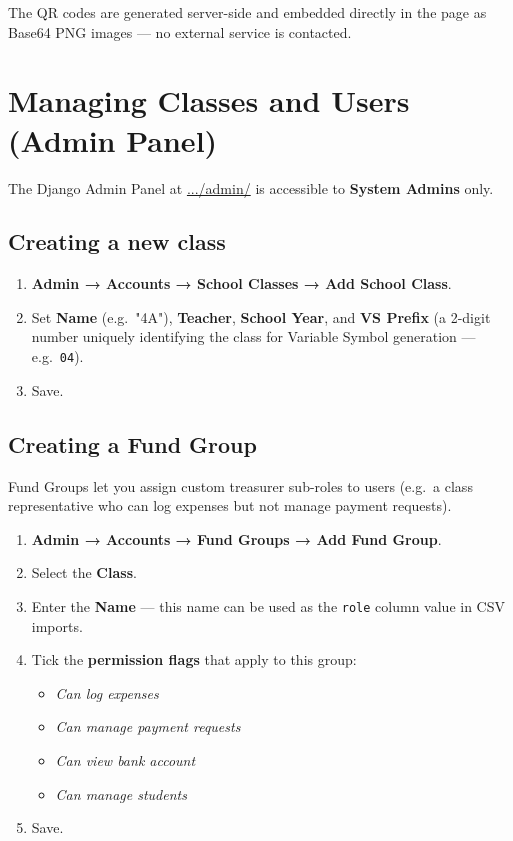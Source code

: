 \documentclass[a4paper,11pt]{article}
\begin{document}
\noindent
The QR codes are generated server-side and embedded directly in the page
as Base64 PNG images — no external service is contacted.

\section{Managing Classes and Users (Admin Panel)}
\label{sec:admin}

The Django Admin Panel at \url{.../admin/} is accessible to \textbf{System Admins} only.

\subsection{Creating a new class}

\begin{enumerate}[noitemsep]
    \item \textbf{Admin → Accounts → School Classes → Add School Class}.
    \item Set \textbf{Name} (e.g.\ "4A"), \textbf{Teacher}, \textbf{School Year},
          and \textbf{VS Prefix} (a 2-digit number uniquely identifying the class
          for Variable Symbol generation — e.g.\ \texttt{04}).
    \item Save.
\end{enumerate}

\subsection{Creating a Fund Group}

Fund Groups let you assign custom treasurer sub-roles to users
(e.g.\ a class representative who can log expenses but not manage payment
requests).

\begin{enumerate}[noitemsep]
    \item \textbf{Admin → Accounts → Fund Groups → Add Fund Group}.
    \item Select the \textbf{Class}.
    \item Enter the \textbf{Name} — this name can be used as the
          \texttt{role} column value in CSV imports.
    \item Tick the \textbf{permission flags} that apply to this group:
        \begin{itemize}[noitemsep]
            \item \textit{Can log expenses}
            \item \textit{Can manage payment requests}
            \item \textit{Can view bank account}
            \item \textit{Can manage students}
        \end{itemize}
    \item Save.
\end{enumerate}
\end{document}
